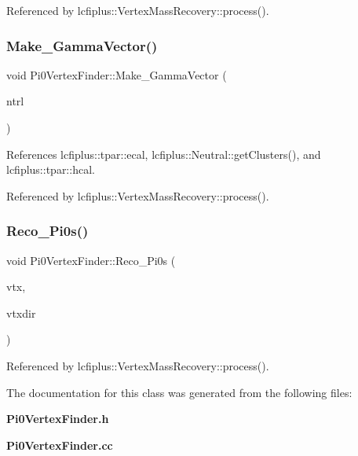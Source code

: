Referenced by lcfiplus\+::\+Vertex\+Mass\+Recovery\+::process().

\mbox{\label{classlcfiplus_1_1Pi0VertexFinder_a0ce350c269f06a79f449d13845428679}} 
\subsubsection{Make\+\_\+\+Gamma\+Vector()}
{\footnotesize\ttfamily void Pi0\+Vertex\+Finder\+::\+Make\+\_\+\+Gamma\+Vector (\begin{DoxyParamCaption}\item[{const \textbf{ lcfiplus\+::\+Neutral} $\ast$}]{ntrl }\end{DoxyParamCaption})}



References lcfiplus\+::tpar\+::ecal, lcfiplus\+::\+Neutral\+::get\+Clusters(), and lcfiplus\+::tpar\+::hcal.



Referenced by lcfiplus\+::\+Vertex\+Mass\+Recovery\+::process().

\mbox{\label{classlcfiplus_1_1Pi0VertexFinder_a5607958c83fe0e48c36e95a5b7c888cd}} 
\subsubsection{Reco\+\_\+\+Pi0s()}
{\footnotesize\ttfamily void Pi0\+Vertex\+Finder\+::\+Reco\+\_\+\+Pi0s (\begin{DoxyParamCaption}\item[{T\+Vector3}]{vtx,  }\item[{T\+Vector3}]{vtxdir }\end{DoxyParamCaption})}



Referenced by lcfiplus\+::\+Vertex\+Mass\+Recovery\+::process().



The documentation for this class was generated from the following files\+:\begin{DoxyCompactItemize}
\item 
\textbf{ Pi0\+Vertex\+Finder.\+h}\item 
\textbf{ Pi0\+Vertex\+Finder.\+cc}\end{DoxyCompactItemize}
